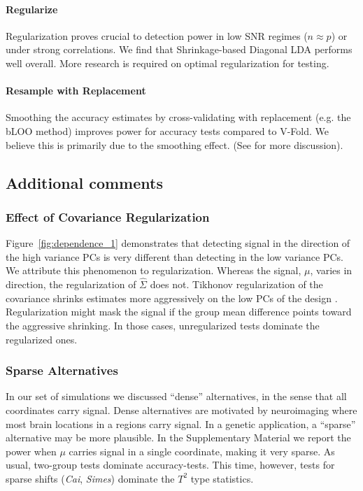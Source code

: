 \documentclass[oupdraft]{bio}
\begin{document}
\paragraph{Regularize} Regularization proves crucial to detection power in low SNR regimes ($n \approx p$) or under strong correlations. We find that Shrinkage-based Diagonal LDA \citep{pang_shrinkage-based_2009} performs well overall. More research is required on optimal regularization for testing. 
\paragraph{Resample with Replacement}
Smoothing the accuracy estimates by cross-validating with replacement (e.g. the bLOO method) improves power for accuracy tests compared to V-Fold. We believe this is primarily due to the smoothing effect. (See \cite{yu2007two} for more discussion).  








\subsection{Additional comments}

\subsubsection{Effect of Covariance Regularization}
\label{sec:regularizaton}

Figure~\ref{fig:dependence_1} demonstrates that detecting signal in the direction of the high variance PCs is very different than detecting in the low variance PCs.
We attribute this phenomenon to regularization.
Whereas the signal, $\mu$, varies in direction, the regularization of $\hat \Sigma$ does not. 
Tikhonov regularization of the covariance shrinks estimates more aggressively on the low PCs of the design \citep{hastie_elements_2003}. 
Regularization might mask the signal if the group mean difference points toward the aggressive shrinking. 
In those cases, unregularized tests dominate the regularized ones.


\subsubsection{Sparse Alternatives}
\label{sec:sparse}
In our set of simulations we discussed ``dense'' alternatives, in the sense that all coordinates carry signal.
Dense alternatives are motivated by neuroimaging where most brain locations in a regions carry signal.
In a genetic application, a ``sparse'' alternative may be more plausible. 
In the Supplementary Material we report the power when $\mu$ carries signal in a single coordinate, making it very sparse. 
As usual, two-group tests dominate accuracy-tests.
This time, however, tests for sparse shifts  (\emph{Cai}, \emph{Simes}) dominate the $T^2$ type statistics.
\end{document}
